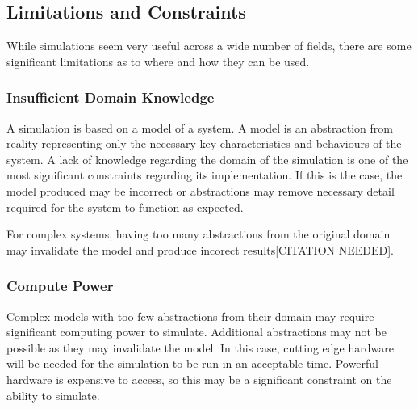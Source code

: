 \documentclass{UoYCSproject}
\begin{document}

\subsection{Limitations and Constraints}
While simulations seem very useful across a wide number of fields, there are some significant limitations as to where and how they can be used.

\subsubsection{Insufficient Domain Knowledge}
\label{domain_knowledge}
A simulation is based on a model of a system. A model is an abstraction from reality representing only the necessary key characteristics and behaviours of the system. A lack of knowledge regarding the domain of the simulation is one of the most significant constraints regarding its implementation. If this is the case, the model produced may be incorrect or abstractions may remove necessary detail required for the system to function as expected.%

For complex systems, having too many abstractions from the original domain may invalidate the model and produce incorect results[CITATION NEEDED].

\subsubsection{Compute Power}
Complex models with too few abstractions from their domain may require significant computing power to simulate. Additional abstractions may not be possible as they may invalidate the model. In this case, cutting edge hardware will be needed for the simulation to be run in an acceptable time. Powerful hardware is expensive to access, so this may be a significant constraint on the ability to simulate.



\end{document}
